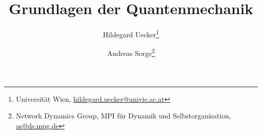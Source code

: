 \documentclass[a4paper,10pt]{scrbook}
\begin{document}
\titlehead{\large Organisation zur Erforschung komplexer adaptiver Systeme (or-cas) e.V.}
\subject{Skript zum Repetitorium}
\title{Grundlagen der Quantenmechanik}
\author{Hildegard Uecker\thanks{Universit\"at Wien, \href{mailto:hildegard.uecker@univie.ac.at}{hildegard.uecker@univie.ac.at}} \and Andreas Sorge\thanks{Network Dynamics Group, MPI f\"ur Dynamik und Selbstorganisation, \href{mailto:as@ds.mpg.de}{as@ds.mpg.de}}}
\maketitle
\end{document}
